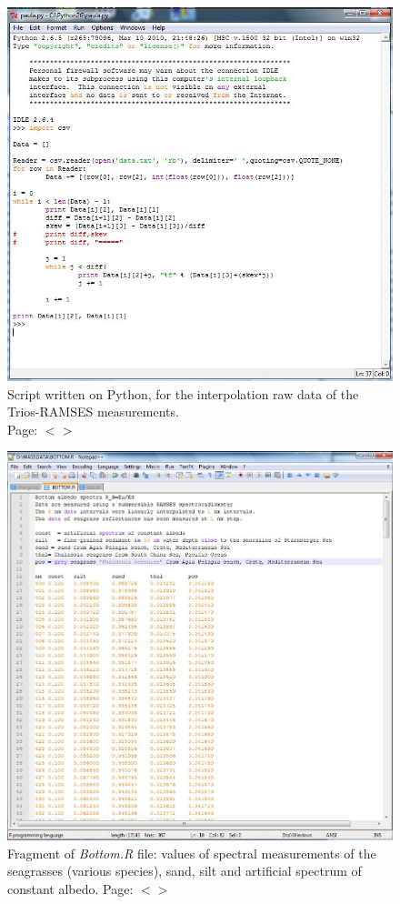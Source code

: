 \documentclass[11pt]{article}
\begin{document}
\begin{appendices}
\begin{figure}[H]
	\centering
	\includegraphics[scale=0.55]{Fig-24.jpg}
	\caption{Script written on Python, for the interpolation raw data of the Trios-RAMSES measurements. \\ Page: $<$\pageref{page-28}$>$}
	\label{fig:A.8}
\end{figure}
\pagebreak

\begin{figure}[H]
	\centering
	\includegraphics[scale=0.4]{Fig-28.jpg}
	\caption{Fragment of \textit{Bottom.R} file: values of spectral measurements of the
		seagrasses (various species), sand, silt and artificial spectrum of constant albedo. Page: $<$\pageref{page-28}$>$}
	\label{fig:A.9}
\end{figure}
\pagebreak


\end{appendices}
\end{document}
